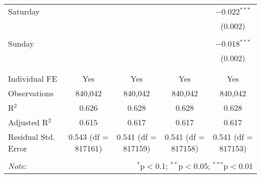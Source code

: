 \documentclass[
]{article}
\begin{document}
\begin{table}[!htbp]
{\begin{tabular}{@{\extracolsep{5pt}}lcccc}
 Saturday &  &  &  & $-$0.022$^{***}$ \\ 
  &  &  &  & (0.002) \\ 
  & & & & \\ 
 Sunday &  &  &  & $-$0.018$^{***}$ \\ 
  &  &  &  & (0.002) \\ 
  & & & & \\ 
\hline \\[-1.8ex] 
Individual FE & Yes & Yes & Yes & Yes \\ 
Observations & 840,042 & 840,042 & 840,042 & 840,042 \\ 
R$^{2}$ & 0.626 & 0.628 & 0.628 & 0.628 \\ 
Adjusted R$^{2}$ & 0.615 & 0.617 & 0.617 & 0.617 \\ 
Residual Std. Error & 0.543 (df = 817161) & 0.541 (df = 817159) & 0.541 (df = 817158) & 0.541 (df = 817153) \\ 
\hline 
\hline \\[-1.8ex] 
\textit{Note:}  & \multicolumn{4}{r}{$^{*}$p$<$0.1; $^{**}$p$<$0.05; $^{***}$p$<$0.01} \\ 
\end{tabular}
} 
\end{table} 
\newpage
\end{document}
